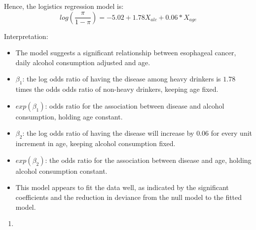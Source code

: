 \documentclass[
]{article}
\providecommand{\tightlist}{%
  \setlength{\itemsep}{0pt}\setlength{\parskip}{0pt}}
\begin{document}
Hence, the logistics regression model is:
\[log(\frac{\pi}{1-\pi}) = -5.02 + 1.78X_{alc} + 0.06*X_{age}\]

Interpretation:

\begin{itemize}
\item
  The model suggests a significant relationship between esophageal
  cancer, daily alcohol consumption adjusted and age.
\item
  \(\beta_{1}\): the log odds ratio of having the disease among heavy
  drinkers is \(1.78\) times the odds odds ratio of non-heavy drinkers,
  keeping age fixed.
\item
  \(exp(\beta_{1})\): odds ratio for the association between disease and
  alcohol consumption, holding age constant.
\item
  \(\beta_{2}\): the log odds ratio of having the disease will increase
  by \(0.06\) for every unit increment in age, keeping alcohol
  consumption fixed.
\item
  \(exp(\beta_{2})\): the odds ratio for the association between disease
  and age, holding alcohol consumption constant.
\item
  This model appears to fit the data well, as indicated by the
  significant coefficients and the reduction in deviance from the null
  model to the fitted model.
\end{itemize}

\begin{enumerate}
\def\labelenumi{(\alph{enumi})}
\setcounter{enumi}{1}
\tightlist
\item
\end{enumerate}
\end{document}
